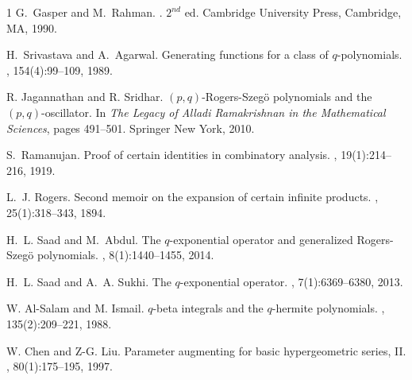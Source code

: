 \documentclass{cimart}
\begin{document}
{\small
    \begin{thebibliography}{1}
 G.~Gasper and M.~Rahman. 
        .
        \newblock $2^{nd}$ ed. Cambridge University Press, Cambridge, MA, 1990.
        
H.~Srivastava and A.~Agarwal.
        \newblock Generating functions for a class of $q$-polynomials.
        , 154(4):99--109, 1989.
        
 R. Jagannathan and  R. Sridhar.
        \newblock $(p,q)$-Rogers-Szeg\"o polynomials and the $(p,q)$-oscillator.
        \newblock In {\em The Legacy of Alladi Ramakrishnan in the Mathematical
          Sciences}, pages 491--501. Springer New York, 2010.
        
        S.~Ramanujan.
        \newblock Proof of certain identities in combinatory analysis.
        , 19(1):214--216, 1919.
        
        L.~J. Rogers.
        \newblock Second memoir on the expansion of certain infinite products.
        , 25(1):318--343, 1894.
        
        H.~L. Saad and M.~Abdul.
        \newblock The $q$-exponential operator and generalized Rogers-Szeg\"o
          polynomials.
        , 8(1):1440--1455, 2014.
        
        H.~L. Saad and A.~A. Sukhi.
        \newblock The $q$-exponential operator.
        , 7(1):6369--6380, 2013.
        
W. Al-Salam and M. Ismail.
        \newblock $q$-beta integrals and the $q$-hermite polynomials.
        , 135(2):209--221, 1988.
        
W. Chen and Z-G. Liu. 
        \newblock Parameter augmenting for basic hypergeometric series, II.
        , 80(1):175--195, 1997.
    \end{thebibliography}
}
\end{document}
